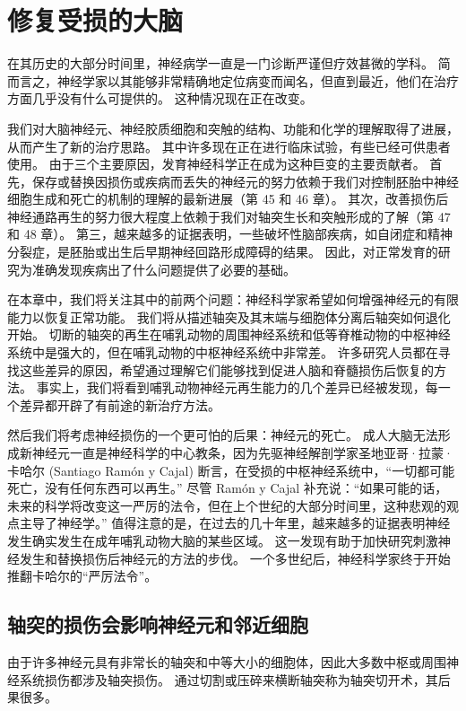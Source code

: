 \chapter{修复受损的大脑} \label{chap:chap50}

在其历史的大部分时间里，神经病学一直是一门诊断严谨但疗效甚微的学科。 简而言之，神经学家以其能够非常精确地定位病变而闻名，但直到最近，他们在治疗方面几乎没有什么可提供的。 这种情况现在正在改变。

我们对大脑神经元、神经胶质细胞和突触的结构、功能和化学的理解取得了进展，从而产生了新的治疗思路。 其中许多现在正在进行临床试验，有些已经可供患者使用。 由于三个主要原因，发育神经科学正在成为这种巨变的主要贡献者。 首先，保存或替换因损伤或疾病而丢失的神经元的努力依赖于我们对控制胚胎中神经细胞生成和死亡的机制的理解的最新进展（第 45 和 46 章）。 其次，改善损伤后神经通路再生的努力很大程度上依赖于我们对轴突生长和突触形成的了解（第 47 和 48 章）。 第三，越来越多的证据表明，一些破坏性脑部疾病，如自闭症和精神分裂症，是胚胎或出生后早期神经回路形成障碍的结果。 因此，对正常发育的研究为准确发现疾病出了什么问题提供了必要的基础。

在本章中，我们将关注其中的前两个问题：神经科学家希望如何增强神经元的有限能力以恢复正常功能。 我们将从描述轴突及其末端与细胞体分离后轴突如何退化开始。 切断的轴突的再生在哺乳动物的周围神经系统和低等脊椎动物的中枢神经系统中是强大的，但在哺乳动物的中枢神经系统中非常差。 许多研究人员都在寻找这些差异的原因，希望通过理解它们能够找到促进人脑和脊髓损伤后恢复的方法。 事实上，我们将看到哺乳动物神经元再生能力的几个差异已经被发现，每一个差异都开辟了有前途的新治疗方法。

然后我们将考虑神经损伤的一个更可怕的后果：神经元的死亡。 成人大脑无法形成新神经元一直是神经科学的中心教条，因为先驱神经解剖学家圣地亚哥·拉蒙·卡哈尔 (Santiago Ramón y Cajal) 断言，在受损的中枢神经系统中，“一切都可能死亡，没有任何东西可以再生。” 尽管 Ramón y Cajal 补充说：“如果可能的话，未来的科学将改变这一严厉的法令，但在上个世纪的大部分时间里，这种悲观的观点主导了神经学。” 值得注意的是，在过去的几十年里，越来越多的证据表明神经发生确实发生在成年哺乳动物大脑的某些区域。 这一发现有助于加快研究刺激神经发生和替换损伤后神经元的方法的步伐。 一个多世纪后，神经科学家终于开始推翻卡哈尔的“严厉法令”。


\section{轴突的损伤会影响神经元和邻近细胞}
由于许多神经元具有非常长的轴突和中等大小的细胞体，因此大多数中枢或周围神经系统损伤都涉及轴突损伤。 通过切割或压碎来横断轴突称为轴突切开术，其后果很多。



